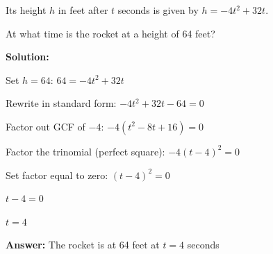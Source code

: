 \documentclass[12pt]{article}
\begin{document}
		Its height $h$ in feet after $t$ seconds is given by $h = -4t^2 + 32t$.
		
		At what time is the rocket at a height of 64 feet?
		
		\textbf{Solution:}
		
		Set $h = 64$: $64 = -4t^2 + 32t$
		
		Rewrite in standard form: $-4t^2 + 32t - 64 = 0$
		
		Factor out GCF of $-4$: $-4(t^2 - 8t + 16) = 0$
		
		Factor the trinomial (perfect square): $-4(t - 4)^2 = 0$
		
		Set factor equal to zero: $(t - 4)^2 = 0$
		
		$t - 4 = 0$
		
		$t = 4$
		
		\textbf{Answer:} The rocket is at 64 feet at $t = 4$ seconds
\end{document}
